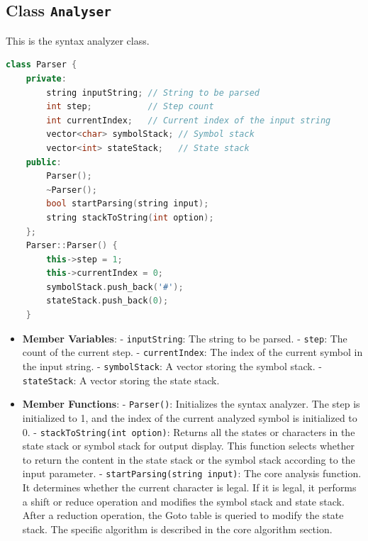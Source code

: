 \documentclass[a4paper,12pt]{article}
\begin{document}
\subsection{Class \texttt{Analyser}}
This is the syntax analyzer class.
\begin{lstlisting}[language=c++]
class Parser {
    private:
        string inputString; // String to be parsed
        int step;           // Step count
        int currentIndex;   // Current index of the input string
        vector<char> symbolStack; // Symbol stack
        vector<int> stateStack;   // State stack
    public:
        Parser();
        ~Parser();
        bool startParsing(string input);
        string stackToString(int option);
    };
    Parser::Parser() {
        this->step = 1;
        this->currentIndex = 0;
        symbolStack.push_back('#');
        stateStack.push_back(0);
    }
\end{lstlisting}
\begin{itemize}
    \item \textbf{Member Variables}:
        - \texttt{inputString}: The string to be parsed.
        - \texttt{step}: The count of the current step.
        - \texttt{currentIndex}: The index of the current symbol in the input string.
        - \texttt{symbolStack}: A vector storing the symbol stack.
        - \texttt{stateStack}: A vector storing the state stack.
    \item \textbf{Member Functions}:
        - \texttt{Parser()}: Initializes the syntax analyzer. The step is initialized to 1, and the index of the current analyzed symbol is initialized to 0.
        - \texttt{stackToString(int option)}: Returns all the states or characters in the state stack or symbol stack for output display. This function selects whether to return the content in the state stack or the symbol stack according to the input parameter.
        - \texttt{startParsing(string input)}: The core analysis function. It determines whether the current character is legal. If it is legal, it performs a shift or reduce operation and modifies the symbol stack and state stack. After a reduction operation, the Goto table is queried to modify the state stack. The specific algorithm is described in the core algorithm section.
\end{itemize}
\end{document}
